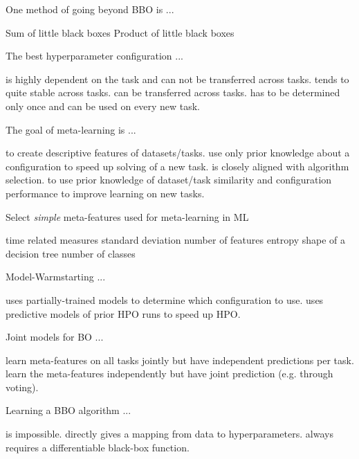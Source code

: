 \documentclass{exam}
\begin{document}
\begin{questions}
\question One method of going beyond BBO is ...
\begin{choices}
    \choice Sum of little black boxes     %
    \choice Product of little black boxes  %
\end{choices}

\question The best hyperparameter configuration ...
\begin{choices}
    \choice is highly dependent on the task and can not be transferred across tasks.
    \choice tends to quite stable across tasks. %
    \choice can be transferred across tasks. %
    \choice has to be determined only once and can be used on every new task.
\end{choices}

\question The goal of meta-learning is ...
\begin{choices}
    \choice to create descriptive features of datasets/tasks.
    \choice use only prior knowledge about a configuration to speed up solving of a new task.
    \choice is closely aligned with algorithm selection. %
    \choice to use prior knowledge of dataset/task similarity and configuration performance to improve learning on new tasks. %
\end{choices}

\question Select \textit{simple} meta-features used for meta-learning in ML
\begin{choices}
    \choice time related measures
    \choice standard deviation
    \choice number of features %
    \choice entropy
    \choice shape of a decision tree
    \choice number of classes %
\end{choices}

\question Model-Warmstarting ...
\begin{choices}
    \choice uses partially-trained models to determine which configuration to use.
    \choice uses predictive models of prior HPO runs to speed up HPO. %
\end{choices}

\question Joint models for BO ...
\begin{choices}
    \choice learn meta-features on all tasks jointly but have independent predictions per task. %
    \choice learn the meta-features independently but have joint prediction (e.g. through voting).
\end{choices}

\question Learning a BBO algorithm ...
\begin{choices}
    \choice is impossible.
    \choice directly gives a mapping from data to hyperparameters. %
    \choice always requires a differentiable black-box function.
\end{choices}


\end{questions}
\end{document}

